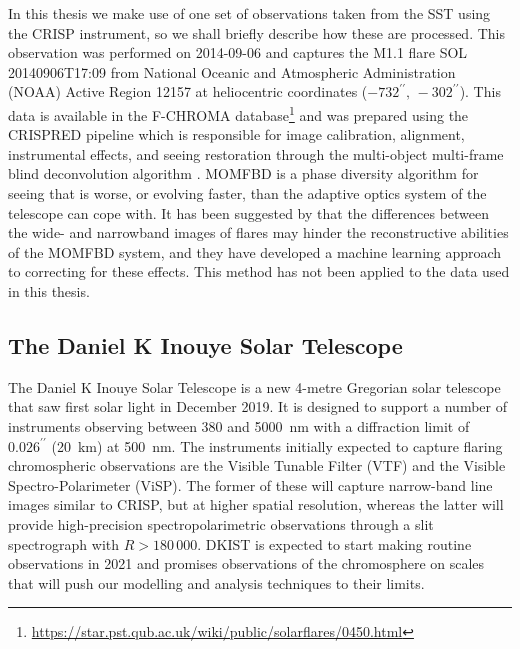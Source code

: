 In this thesis we make use of one set of observations taken from the SST using the CRISP instrument, so we shall briefly describe how these are processed.
This observation was performed on 2014-09-06 and captures the M1.1 flare SOL 20140906T17:09 from National Oceanic and Atmospheric Administration (NOAA) Active Region 12157 at heliocentric coordinates ($-732^{\prime\prime},\,-302^{\prime\prime}$).
This data is available in the F-CHROMA database\footnote{\url{https://star.pst.qub.ac.uk/wiki/public/solarflares/0450.html}} and was prepared using the CRISPRED pipeline \citep{DelaCruzRodriguez2015} which is responsible for image calibration, alignment, instrumental effects, and seeing restoration through the multi-object multi-frame blind deconvolution algorithm \citep[MOMFBD,][]{VanNoort2005}.
MOMFBD is a  phase diversity algorithm  for seeing that is worse, or evolving faster, than the adaptive optics system of the telescope can cope with.
It has been suggested by \citet{Armstrong2021} that the differences between the wide- and narrowband images of flares may hinder the reconstructive abilities of the MOMFBD system, and they have developed a machine learning approach to correcting for these effects.
This method has not been applied to the data used in this thesis.

\subsection{The Daniel K Inouye Solar Telescope}

The Daniel K Inouye Solar Telescope \citep[DKIST,][]{Rimmele2020} is a new 4-metre Gregorian solar telescope that saw first solar light in December 2019.
It is designed to support a number of instruments observing between 380 and \SI{5000}{\nano\metre} with a diffraction limit of $0.026^{\prime\prime}$ (\SI{20}{\kilo\metre}) at \SI{500}{\nano\metre}.
The instruments initially expected to capture flaring chromospheric observations are the Visible Tunable Filter (VTF) and the Visible Spectro-Polarimeter (ViSP).
The former of these will capture narrow-band line images similar to CRISP, but at higher spatial resolution, whereas the latter will provide high-precision spectropolarimetric observations through a slit spectrograph with $R>180\,000$.
DKIST is expected to start making routine observations in 2021 and promises observations of the chromosphere on scales that will push our modelling and analysis techniques to their limits.

